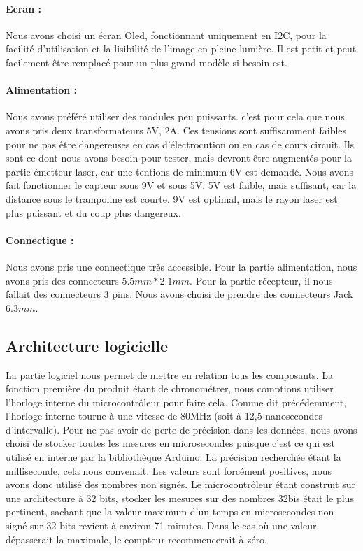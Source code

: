 \paragraph{Ecran :}
Nous avons choisi un  écran Oled, fonctionnant uniquement en I2C, pour la facilité d'utilisation et la lisibilité de l'image en pleine lumière. Il est petit et peut facilement être remplacé pour un plus grand modèle si besoin est.

\paragraph{Alimentation :}
Nous avons préféré utiliser des modules peu puissants. c'est pour cela que nous avons pris deux transformateurs 5V, 2A. Ces tensions sont suffisamment faibles pour ne pas être dangereuses en cas d'électrocution ou en cas de cours circuit. Ils sont ce dont nous avons besoin pour tester, mais devront être augmentés pour la partie émetteur laser, car une tentions de minimum 6V est demandé. Nous avons fait fonctionner le capteur sous 9V et sous 5V. 5V est faible, mais suffisant, car la distance sous le trampoline est courte. 9V est optimal, mais le rayon laser est plus puissant et du coup plus dangereux.

\paragraph{Connectique :}
Nous avons pris une connectique très accessible. Pour la partie alimentation, nous avons pris des connecteurs $5.5mm * 2.1mm$. Pour la partie récepteur, il nous fallait des connecteurs 3 pins. Nous avons choisi de prendre des connecteurs Jack $6.3mm$.

\subsection{Architecture logicielle}
La partie logiciel nous permet de mettre en relation tous les composants. La fonction première du produit étant de chronométrer, nous comptions utiliser l'horloge interne du microcontrôleur pour faire cela. Comme dit précédemment, l'horloge interne tourne à une vitesse de 80MHz (soit à 12,5 nanosecondes d'intervalle). Pour ne pas avoir de perte de précision dans les données, nous avons choisi de stocker toutes les mesures en microsecondes puisque c'est ce qui est utilisé en interne par la bibliothèque Arduino. La précision recherchée étant la milliseconde, cela nous convenait. Les valeurs sont forcément positives, nous avons donc utilisé des nombres non signés. Le microcontrôleur étant construit sur une architecture à 32 bits, stocker les mesures sur des nombres 32bis était le plus pertinent, sachant que la valeur maximum d'un temps en microsecondes non signé sur 32 bits revient à environ 71 minutes. Dans le cas où une valeur dépasserait la maximale, le compteur recommencerait à zéro. 

